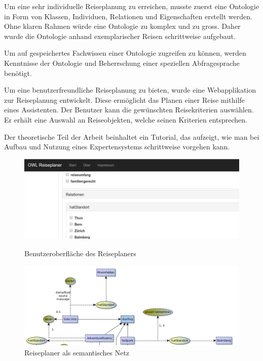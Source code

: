 \documentclass[
    paper=a4,               %
    fontsize=10pt,          %
    open=right,             %
    titlepage=false,        %
    parskip=half,           %
]{scrreprt}                 %
\begin{document}
\begin{multicols}{3}
        Um eine sehr individuelle Reiseplanung zu erreichen, musste zuerst eine Ontologie in Form von Klassen, Individuen, Relationen und Eigenschaften erstellt werden. Ohne klaren Rahmen würde eine Ontologie zu komplex und zu gross. Daher wurde die Ontologie anhand exemplarischer Reisen schrittweise aufgebaut.

        Um auf gespeichertes Fachwissen einer Ontologie zugreifen zu können, werden Kenntnisse der Ontologie und Beherrschung einer speziellen Abfragesprache benötigt.

        Um eine benutzerfreundliche Reiseplanung zu bieten, wurde eine Webapplikation zur Reiseplanung entwickelt. Diese ermöglicht das Planen einer Reise mithilfe eines Assistenten. Der Benutzer kann die gewünschten Reisekriterien auswählen. Er erhält eine Auswahl an Reiseobjekten, welche seinen Kriterien entsprechen.

       Der theoretische Teil der Arbeit beinhaltet ein Tutorial, das aufzeigt, wie man bei Aufbau und Nutzung eines Expertensystems schrittweise vorgehen kann.

    \end{multicols}

    \begin{figure}[htbp]
        \begin{minipage}[hbt]{0,49\textwidth}
            \centering
            \includegraphics[scale=0.3]{bilder/reiseplaner_gui.jpg}
            \caption*{Benutzeroberfläche des Reiseplaners}
        \end{minipage}
        \begin{minipage}[hbt]{0,49\textwidth}
            \centering
            \includegraphics[scale=0.3]{bilder/semantisches_netz.jpg}
            \caption*{Reiseplaner als semantisches Netz}
        \end{minipage}
    \end{figure}
\end{document}
